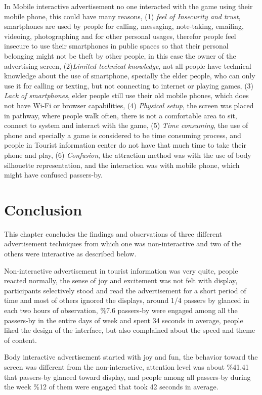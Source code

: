 In Mobile interactive advertisement no one interacted with the game using their mobile phone, this could have many reasons, (1) \emph{feel of Insecurity and trust}, smartphones are used by people for calling, messaging, note-taking, emailing, videoing, photographing and for other personal usages, therefor people feel insecure to use their smartphones in public spaces so that their personal belonging might not be theft by other people, in this case the owner of the advertising screen, (2)\emph{Limited technical knowledge}, not all people have technical knowledge about the use of smartphone, specially the elder people, who can only use it for calling or texting, but not connecting to internet or playing games, (3) \emph{Lack of smartphones}, elder people still use their old mobile phones, which does not have Wi-Fi or browser capabilities, (4) \emph{Physical setup}, the screen was placed in pathway, where people walk often, there is not a comfortable area to sit, connect to system and interact with the game, (5) \emph{Time consuming}, the use of phone and specially a game is considered to be time consuming process, and people in Tourist information center do not have that much time to take their phone and play, (6) \emph{Confusion}, the attraction method was with the use of body silhouette representation, and the interaction was with mobile phone, which might have confused passers-by. 


\section{Conclusion}
This chapter concludes the findings and observations of three different advertisement techniques from which one was non-interactive and two of the others were interactive as described below.

Non-interactive advertisement in tourist information was very quite, people reacted normally, the sense of joy and excitement was not felt with display, participants selectively stood and read the advertisement for a short period of time and most of others ignored the displays, around 1/4 passers by glanced in each two hours of observation, \%7.6 passers-by were engaged among all the passers-by in the entire days of week and spent 34 seconds in average, people liked the design of the interface, but also complained about the speed and theme of content.

Body interactive advertisement started with joy and fun, the behavior toward the screen was different from the non-interactive, attention level was about \%41.41 that passers-by glanced toward display, and people among all passers-by during the week \%12 of them were engaged that took 42 seconds in average.


